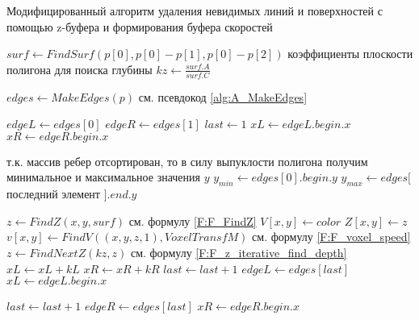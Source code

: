 \begin{breakablealgorithm}
\caption{Модифицированный алгоритм удаления невидимых линий и поверхностей с помощью z-буфера и формирования буфера скоростей} \label{alg:A_DrawPolygon}

\begin{algorithmic}[1]
    \State 
        $surf \leftarrow FindSurf(
            p[0],
            p[0] - p[1],
            p[0] - p[2]
        )$
        \Comment коэффициенты плоскости полигона для поиска глубины
    \State $kz \leftarrow \frac{surf.A}{surf.C}$    
    \Statex

    \State $edges \leftarrow MakeEdges(p)$ \Comment см. псевдокод \ref{alg:A_MakeEdges} 
    
    \State $edgeL \leftarrow edges[0]$ 
    \State $edgeR \leftarrow edges[1]$
    \State $last \leftarrow 1$ 
    \Statex
    \State $xL \leftarrow edgeL.begin.x$ 
    \State $xR \leftarrow edgeR.begin.x$

    \Statex \Comment т.к. массив ребер отсортирован, то в силу выпуклости полигона получим минимальное и максимальное значения $y$
    \State $y_{min} \leftarrow edges[0].begin.y$
    \State $y_{max} \leftarrow edges[$ последний элемент $].end.y$ 

        
        \State $z \leftarrow FindZ(x,y, surf)$ \Comment см. формулу \eqref{F:F_FindZ} 
                \State $V[x,y] \leftarrow color$
                \State $Z[x,y] \leftarrow z$
                \State $v[x,y] \leftarrow FindV((x,y,z,1), VoxelTransfM)$ 
                \Statex \Comment см. формулу \eqref{F:F_voxel_speed} 
            \EndIf
            \State $z \leftarrow FindNextZ(kz, z)$ \Comment см. формулу \eqref{F:F_z_iterative_find_depth} 
        \EndFor
        \State $xL \leftarrow xL + kL$
        \State $xR \leftarrow xR + kR$
            \State $last \leftarrow last + 1$
            \State $edgeL \leftarrow edges[last]$
            \State $xL \leftarrow edgeL.begin.x$ 
        \EndIf
        
            \State $last \leftarrow last + 1$
            \State $edgeR \leftarrow edges[last]$
            \State $xR \leftarrow edgeR.begin.x$ 
        \EndIf

    \EndFor
    
\EndFunction
\Statex 

\end{algorithmic}
\end{breakablealgorithm}

